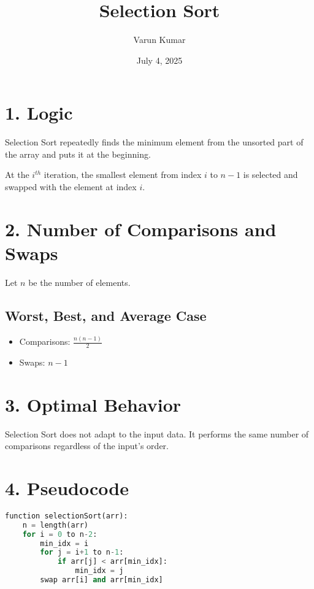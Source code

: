 \documentclass[14pt]{extarticle}
\title{\textbf{Selection Sort}}
\author{Varun Kumar}
\date{July 4, 2025}
\begin{document}
\maketitle

\section*{1. Logic}

Selection Sort repeatedly finds the minimum element from the unsorted part of the array and puts it at the beginning.

\begin{tcolorbox}[
  colback=white,
  colframe=black,
  title=Key Idea
]
At the $i^{th}$ iteration, the smallest element from index $i$ to $n-1$ is selected and swapped with the element at index $i$.
\end{tcolorbox}

\section*{2. Number of Comparisons and Swaps}

Let $n$ be the number of elements.

\subsection*{Worst, Best, and Average Case}

\begin{itemize}
    \item Comparisons: $\frac{n(n-1)}{2}$
    \item Swaps: $n - 1$
\end{itemize}

\section*{3. Optimal Behavior}

Selection Sort does not adapt to the input data. It performs the same number of comparisons regardless of the input's order.

\section*{4. Pseudocode}

\begin{lstlisting}[language=Python]
function selectionSort(arr):
    n = length(arr)
    for i = 0 to n-2:
        min_idx = i
        for j = i+1 to n-1:
            if arr[j] < arr[min_idx]:
                min_idx = j
        swap arr[i] and arr[min_idx]
\end{lstlisting}
\end{document}
